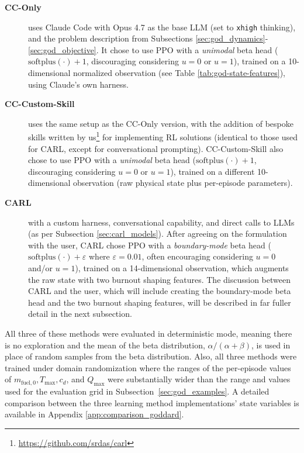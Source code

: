 \documentclass[mnsc,sglanonrev]{informs4}
\begin{document}
\begin{description}
  \item[\textbf{CC-Only}] uses Claude Code with Opus 4.7 as the base LLM (set to \texttt{xhigh} thinking), and the problem description from Subsections \ref{sec:god_dynamics}-\ref{sec:god_objective}. It chose to use PPO with a \emph{unimodal} beta head ($\mathrm{softplus}(\cdot) + 1$, discouraging considering $u=0$ or $u=1$), trained on a 10-dimensional normalized observation (see Table \ref{tab:god-state-features}), using Claude's own harness. 
  
  \item[\textbf{CC-Custom-Skill}] uses the same setup as the CC-Only version, with the addition of bespoke skills written by us\footnote{\url{https://github.com/srdas/carl}} for implementing RL solutions (identical to those used for CARL, except for conversational prompting). CC-Custom-Skill  also chose to use PPO with a \emph{unimodal} beta head ($\mathrm{softplus}(\cdot) + 1$, discouraging considering $u=0$ or $u=1$), trained on a different 10-dimensional observation (raw physical state plus per-episode parameters). 

  \item[\textbf{CARL}] with a custom harness, conversational capability, and direct calls to LLMs (as per Subsection \ref{sec:carl_models}). After agreeing on the formulation with the user, CARL chose PPO with a \emph{boundary-mode} beta head ($\mathrm{softplus}(\cdot) + \varepsilon$ where $\varepsilon=0.01$, often encouraging considering $u=0$ and/or $u=1$), trained on a 14-dimensional observation, which augments the raw state with two burnout shaping features. The discussion between CARL and the user, which will include creating the boundary-mode beta head and the two burnout shaping features, will be described in far fuller detail in the next subsection.
\end{description}
%
All three of these methods were evaluated in deterministic mode, meaning there is no exploration and the mean of the beta distribution, $\alpha/(\alpha+\beta)$, is used in place of random samples from the beta distribution. Also, all three methods were trained under domain randomization where the ranges of the per-episode  values of 
$m_{\mathrm{fuel},0}, T_{\max}, c_d$, and $Q_{\max}$ were substantially wider than the range and values used for the evaluation grid in Subsection~\ref{sec:god_examples}. A detailed comparison between the three learning method implementations' state variables is available in Appendix \ref{app:comparison_goddard}.
\end{document}
